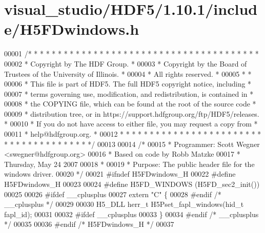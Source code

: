 \hypertarget{visual__studio_2_h_d_f5_21_810_81_2include_2_h5_f_dwindows_8h_source}{}\section{visual\+\_\+studio/\+H\+D\+F5/1.10.1/include/\+H5\+F\+Dwindows.h}
\label{visual__studio_2_h_d_f5_21_810_81_2include_2_h5_f_dwindows_8h_source}

\begin{DoxyCode}
00001 \textcolor{comment}{/* * * * * * * * * * * * * * * * * * * * * * * * * * * * * * * * * * * * * * *}
00002 \textcolor{comment}{ * Copyright by The HDF Group.                                               *}
00003 \textcolor{comment}{ * Copyright by the Board of Trustees of the University of Illinois.         *}
00004 \textcolor{comment}{ * All rights reserved.                                                      *}
00005 \textcolor{comment}{ *                                                                           *}
00006 \textcolor{comment}{ * This file is part of HDF5.  The full HDF5 copyright notice, including     *}
00007 \textcolor{comment}{ * terms governing use, modification, and redistribution, is contained in    *}
00008 \textcolor{comment}{ * the COPYING file, which can be found at the root of the source code       *}
00009 \textcolor{comment}{ * distribution tree, or in https://support.hdfgroup.org/ftp/HDF5/releases.  *}
00010 \textcolor{comment}{ * If you do not have access to either file, you may request a copy from     *}
00011 \textcolor{comment}{ * help@hdfgroup.org.                                                        *}
00012 \textcolor{comment}{ * * * * * * * * * * * * * * * * * * * * * * * * * * * * * * * * * * * * * * */}
00013 
00014 \textcolor{comment}{/*}
00015 \textcolor{comment}{ * Programmer:  Scott Wegner <swegner@hdfgroup.org>}
00016 \textcolor{comment}{ *              Based on code by Robb Matzke}
00017 \textcolor{comment}{ *              Thursday, May 24 2007}
00018 \textcolor{comment}{ *}
00019 \textcolor{comment}{ * Purpose: The public header file for the windows driver.}
00020 \textcolor{comment}{ */}
00021 \textcolor{preprocessor}{#ifndef H5FDwindows\_H}
00022 \textcolor{preprocessor}{#define H5FDwindows\_H}
00023 
00024 \textcolor{preprocessor}{#define H5FD\_WINDOWS    (H5FD\_sec2\_init())}
00025 
00026 \textcolor{preprocessor}{#ifdef \_\_cplusplus}
00027 \textcolor{keyword}{extern} \textcolor{stringliteral}{"C"} \{
00028 \textcolor{preprocessor}{#endif }\textcolor{comment}{/* \_\_cplusplus */}\textcolor{preprocessor}{}
00029 
00030 H5\_DLL herr\_t H5Pset\_fapl\_windows(hid\_t fapl\_id);
00031 
00032 \textcolor{preprocessor}{#ifdef \_\_cplusplus}
00033 \}
00034 \textcolor{preprocessor}{#endif }\textcolor{comment}{/* \_\_cplusplus */}\textcolor{preprocessor}{}
00035 
00036 \textcolor{preprocessor}{#endif }\textcolor{comment}{/* H5FDwindows\_H */}\textcolor{preprocessor}{}
00037 
\end{DoxyCode}
